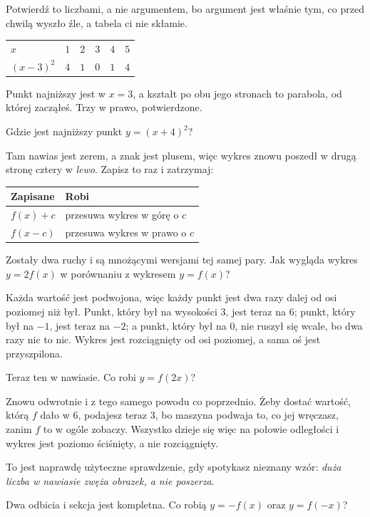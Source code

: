 \begin{fr}
Potwierdź to liczbami, a nie argumentem, bo argument jest właśnie tym, co
przed chwilą wyszło źle, a tabela ci nie skłamie.

\begin{center}
\begin{tabular}{lccccc}
\toprule
$x$ & $1$ & $2$ & $3$ & $4$ & $5$ \\
$(x - 3)^{2}$ & $4$ & $1$ & $0$ & $1$ & $4$ \\
\bottomrule
\end{tabular}
\end{center}

Punkt najniższy jest w $x = 3$, a kształt po obu jego stronach to parabola, od
której zacząłeś. Trzy w prawo, potwierdzone.

Gdzie jest najniższy punkt $y = (x + 4)^{2}$?
\nextframe
\end{fr}

\begin{fr}
Tam nawias jest zerem, a znak jest plusem, więc wykres znowu poszedł w drugą
stronę \dash{} cztery w \emph{lewo}. Zapisz to raz i zatrzymaj:

\begin{center}
\begin{tabular}{ll}
\toprule
Zapisane & Robi \\
\midrule
$f(x) + c$ & przesuwa wykres w górę o $c$ \\
$f(x - c)$ & przesuwa wykres w prawo o $c$ \\
\bottomrule
\end{tabular}
\end{center}

Zostały dwa ruchy i są mnożącymi wersjami tej samej pary. Jak wygląda wykres
$y = 2f(x)$ w porównaniu z wykresem $y = f(x)$?
\nextframe
\end{fr}

\begin{fr}
Każda wartość jest podwojona, więc każdy punkt jest dwa razy dalej od osi
poziomej niż był. Punkt, który był na wysokości $3$, jest teraz na $6$; punkt,
który był na $-1$, jest teraz na $-2$; a punkt, który był na $0$, nie ruszył
się wcale, bo dwa razy nic to nic. Wykres jest rozciągnięty od osi poziomej, a
sama oś jest przyszpilona.

Teraz ten w nawiasie. Co robi $y = f(2x)$?
\nextframe
\end{fr}

\begin{fr}
Znowu odwrotnie i z tego samego powodu co poprzednio. Żeby dostać wartość,
którą $f$ dało w $6$, podajesz teraz $3$, bo maszyna podwaja to, co jej
wręczasz, zanim $f$ to w ogóle zobaczy. Wszystko dzieje się więc na połowie
odległości i wykres jest poziomo ściśnięty, a nie rozciągnięty.

To jest naprawdę użyteczne sprawdzenie, gdy spotykasz nieznany wzór:
\emph{duża liczba w nawiasie zwęża obrazek, a nie poszerza}.

Dwa odbicia i sekcja jest kompletna. Co robią $y = -f(x)$ oraz $y = f(-x)$?
\nextframe
\end{fr}

